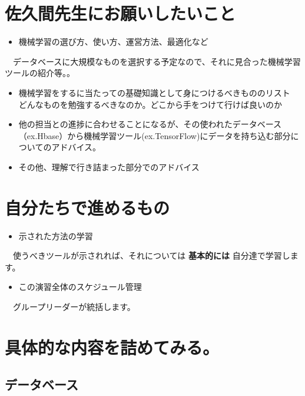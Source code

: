 \documentclass{scrartcl}
\begin{document}
\section{佐久間先生にお願いしたいこと}
\label{sec:org80d1e4a}
\begin{itemize}
\item 機械学習の選び方、使い方、運営方法、最適化など\\
\end{itemize}
　データベースに大規模なものを選択する予定なので、それに見合った機械学習ツールの紹介等。。\\
\begin{itemize}
\item 機械学習をするに当たっての基礎知識として身につけるべきもののリスト\\
どんなものを勉強するべきなのか。どこから手をつけて行けば良いのか\\
\item 他の担当との進捗に合わせることになるが、その使われたデータベース（ex.Hbase）から機械学習ツール(ex.TensorFlow)にデータを持ち込む部分についてのアドバイス。\\
\item その他、理解で行き詰まった部分でのアドバイス\\
\end{itemize}
\section{自分たちで進めるもの}
\label{sec:orge65f25c}
\begin{itemize}
\item 示された方法の学習\\
\end{itemize}
　使うべきツールが示されれば、それについては \textbf{基本的には} 自分達で学習します。\\
\begin{itemize}
\item この演習全体のスケジュール管理\\
\end{itemize}
　グループリーダーが統括します。\\
\section{具体的な内容を詰めてみる。}
\label{sec:org22a18a3}
\subsection{データベース}
\label{sec:org37e409d}
\end{document}
